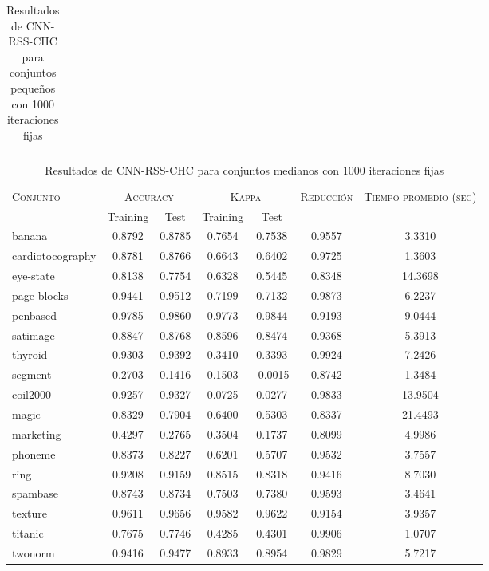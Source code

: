 \begin{table}[]
\begin{tabular}{l c c c c c c}
\hline
\end{tabular}
\caption{Resultados de CNN-RSS-CHC para conjuntos pequeños con 1000 iteraciones fijas}
\label{res-peq-CNN-RSS-CHC}
\end{table}


\begin{table}[]
\centering
\begin{tabular}{l c c c c c c}
\hline
\multirow{2}{*}{\textsc{Conjunto}}
	& \multicolumn{2}{c}{\textsc{Accuracy}}
	& \multicolumn{2}{c}{\textsc{Kappa}}
	& \textsc{Reducción}
	& \textsc{Tiempo promedio (seg)} \\
	& Training & Test
	& Training & Test \\ 
\hline
\hline

banana & 0.8792 & 0.8785 & 0.7654 & 0.7538 & 0.9557 & 3.3310 \\
cardiotocography & 0.8781 & 0.8766 & 0.6643 & 0.6402 & 0.9725 & 1.3603 \\
eye-state & 0.8138 & 0.7754 & 0.6328 & 0.5445 & 0.8348 & 14.3698 \\
page-blocks & 0.9441 & 0.9512 & 0.7199 & 0.7132 & 0.9873 & 6.2237 \\
penbased & 0.9785 & 0.9860 & 0.9773 & 0.9844 & 0.9193 & 9.0444 \\
satimage & 0.8847 & 0.8768 & 0.8596 & 0.8474 & 0.9368 & 5.3913 \\
thyroid & 0.9303 & 0.9392 & 0.3410 & 0.3393 & 0.9924 & 7.2426 \\
segment & 0.2703 & 0.1416 & 0.1503 & -0.0015 & 0.8742 & 1.3484 \\
coil2000 & 0.9257 & 0.9327 & 0.0725 & 0.0277 & 0.9833 & 13.9504 \\
magic & 0.8329 & 0.7904 & 0.6400 & 0.5303 & 0.8337 &  21.4493 \\
marketing & 0.4297 & 0.2765 & 0.3504 & 0.1737 & 0.8099 & 4.9986 \\
phoneme & 0.8373 & 0.8227 & 0.6201 & 0.5707 & 0.9532 & 3.7557 \\
ring & 0.9208 & 0.9159 & 0.8515 & 0.8318 & 0.9416 & 8.7030 \\
spambase & 0.8743 & 0.8734 & 0.7503 & 0.7380 & 0.9593 & 3.4641 \\
texture & 0.9611 & 0.9656 & 0.9582 & 0.9622 & 0.9154 & 3.9357 \\
titanic & 0.7675 & 0.7746 & 0.4285 & 0.4301 & 0.9906 & 1.0707 \\
twonorm & 0.9416 & 0.9477 & 0.8933 & 0.8954 & 0.9829 & 5.7217 \\	

\hline
\end{tabular}
\caption{Resultados de CNN-RSS-CHC para conjuntos medianos con 1000 iteraciones fijas}
\label{res-med-CNN-RSS-CHC}
\end{table}


